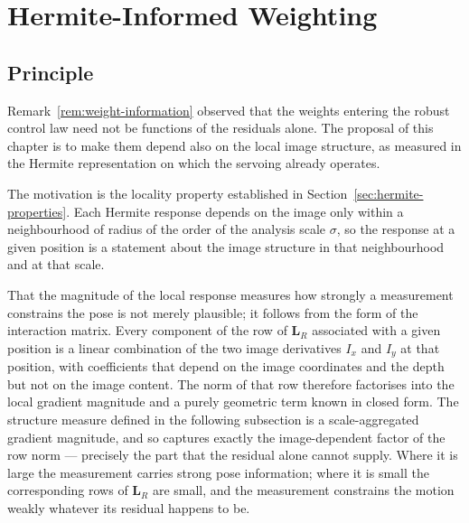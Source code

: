 \section{Hermite-Informed Weighting}
\label{sec:hermite-weight}

\subsection{Principle}
\label{sec:hermite-principle}

Remark~\ref{rem:weight-information} observed that the weights entering the
robust control law need not be functions of the residuals alone. The proposal
of this chapter is to make them depend also on the local image structure, as
measured in the Hermite representation on which the servoing already operates.

The motivation is the locality property established in
Section~\ref{sec:hermite-properties}. Each Hermite response depends on the
image only within a neighbourhood of radius of the order of the analysis scale
$\sigma$, so the response at a given position is a statement about the image
structure in that neighbourhood and at that scale.

That the magnitude of the local response measures how strongly a measurement
constrains the pose is not merely plausible; it follows from the form of the
interaction matrix. Every component of the row of $\mathbf{L}_{R}$ associated
with a given position is a linear combination of the two image derivatives
$I_{x}$ and $I_{y}$ at that position, with coefficients that depend on the
image coordinates and the depth but not on the image content. The norm of that
row therefore factorises into the local gradient magnitude and a purely
geometric term known in closed form. The structure measure defined in the
following subsection is a scale-aggregated gradient magnitude, and so captures
exactly the image-dependent factor of the row norm --- precisely the part that
the residual alone cannot supply. Where it is large the measurement carries
strong pose information; where it is small the corresponding rows of
$\mathbf{L}_{R}$ are small, and the measurement constrains the motion weakly
whatever its residual happens to be.

